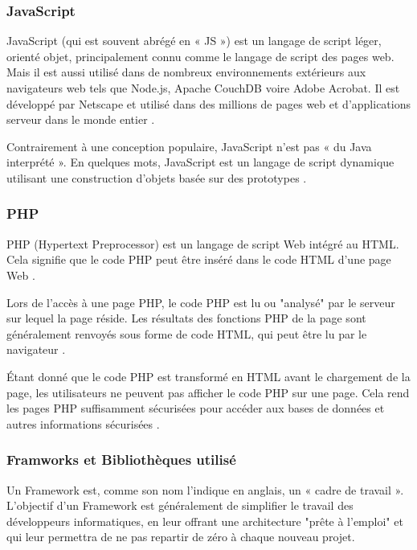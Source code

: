 \documentclass[french]{report}
\begin{document}
        \subsubsection{JavaScript}
        JavaScript (qui est souvent abrégé en « JS ») est un langage de script léger,
	orienté objet, principalement connu comme le langage de script des pages web. 
	Mais il est aussi utilisé dans de nombreux environnements extérieurs aux navigateurs 
	web tels que Node.js, Apache CouchDB voire Adobe Acrobat. Il est développé par 
	Netscape et utilisé dans des millions de pages web et d'applications serveur dans le monde entier \cite{js}.
        
        Contrairement à une conception populaire, JavaScript n'est pas « du Java interprété ».
	En quelques mots, JavaScript est un langage de script dynamique utilisant une construction 
	d'objets basée sur des prototypes \cite{js}.
        
        \subsubsection{PHP }
        PHP (Hypertext Preprocessor) est un langage de script Web intégré au HTML. 
	Cela signifie que le code PHP peut être inséré dans le code HTML d'une page Web \cite{php}.
        
        Lors de l'accès à une page PHP, le code PHP est lu ou "analysé" par le serveur sur
	lequel la page réside. Les résultats des fonctions PHP de la page sont généralement
	renvoyés sous forme de code HTML, qui peut être lu par le navigateur \cite{php}.
        
        Étant donné que le code PHP est transformé en HTML avant le chargement de la page,
	les utilisateurs ne peuvent pas afficher le code PHP sur une page. Cela rend les
	pages PHP suffisamment sécurisées pour accéder aux bases de données et autres informations sécurisées \cite{php}.
        
    \subsubsection{Framworks et Bibliothèques utilisé}
    Un Framework est, comme son nom l'indique en anglais, un «  cadre de travail ». L'objectif
    d'un Framework est généralement de simplifier le travail des développeurs informatiques,
    en leur offrant une architecture "prête à l'emploi" et qui leur permettra de ne pas repartir de zéro à chaque nouveau projet.
    
\end{document}

